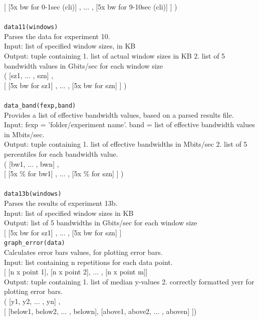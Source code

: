 \documentclass[]{scrartcl}
\begin{document}
{[  [5x bw for 0-1sec (cli)]  ,  ...  ,  [5x bw for 9-10sec (cli)]  ]}  )  \\
\\
\texttt{data11(windows)}  \\
Parses the data for experiment 10.\\
Input: list of specified window sizes, in KB  \\
Output: tuple containing 1. list of actual window sizes in KB 2. list of 5 bandwidth values in Gbits/sec for each window size   \\
(  [sz1, ... , szn] ,  \\
{[  [5x bw for sz1]  ,  ...  ,  [5x bw for szn]  ]}  )  \\
\\
\texttt{data{\_}band(fexp,band)}   \\
Provides a list of effective bandwidth values, based on a parsed results file.\\
Input: fexp = 'folder/experiment name'. band = list of effective bandwidth values in Mbits/sec.   \\
Output: tuple containing 1. list of effective bandwidths in Mbits/sec 2. list of 5 percentiles for each bandwidth value.    \\
(  [bw1, ... , bwn] ,  \\
{[  [5x \% for bw1]  ,  ...  ,  [5x \% for szn]  ]}  )  \\
\\
\texttt{data13b(windows)} \\  
Parses the results of experiment 13b.\\
Input: list of specified window sizes in KB  \\
Output: list of 5 bandwidths in Gbits/sec for each window size  \\
{[  [5x bw for sz1]  ,  ...  ,  [5x bw for szn]  ]}
\\
\texttt{graph{\_}error(data)} \\
Calculates error bars values, for plotting error bars.\\
Input: list containing n repetitions for each data point. \\
{[ [n x point 1], [n x point 2], ... , [n x point m]]}\\
Output: tuple containing 1. list of median y-values 2. correctly formatted yerr for plotting error bars. \\
(  [y1, y2, ... , yn] , \\
{[ [below1, below2, ... , belown], [above1, above2, ... , aboven] ]})\\ 
\\
\end{document}
